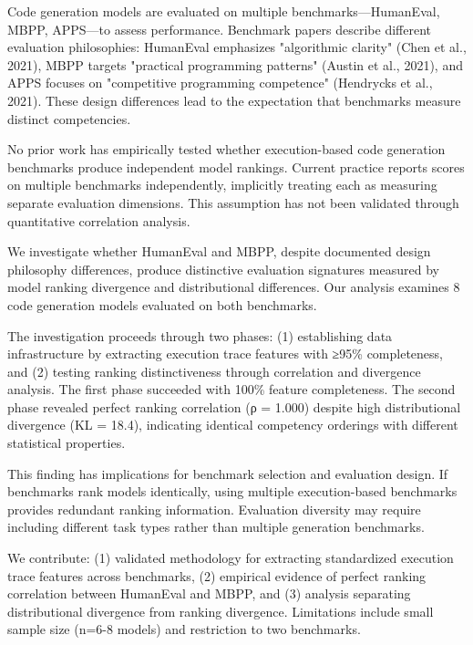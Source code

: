 
Code generation models are evaluated on multiple benchmarks—HumanEval, MBPP, APPS—to assess performance. Benchmark papers describe different evaluation philosophies: HumanEval emphasizes "algorithmic clarity" (Chen et al., 2021), MBPP targets "practical programming patterns" (Austin et al., 2021), and APPS focuses on "competitive programming competence" (Hendrycks et al., 2021). These design differences lead to the expectation that benchmarks measure distinct competencies.

No prior work has empirically tested whether execution-based code generation benchmarks produce independent model rankings. Current practice reports scores on multiple benchmarks independently, implicitly treating each as measuring separate evaluation dimensions. This assumption has not been validated through quantitative correlation analysis.

We investigate whether HumanEval and MBPP, despite documented design philosophy differences, produce distinctive evaluation signatures measured by model ranking divergence and distributional differences. Our analysis examines 8 code generation models evaluated on both benchmarks.

The investigation proceeds through two phases: (1) establishing data infrastructure by extracting execution trace features with ≥95\% completeness, and (2) testing ranking distinctiveness through correlation and divergence analysis. The first phase succeeded with 100\% feature completeness. The second phase revealed perfect ranking correlation (ρ = 1.000) despite high distributional divergence (KL = 18.4), indicating identical competency orderings with different statistical properties.

This finding has implications for benchmark selection and evaluation design. If benchmarks rank models identically, using multiple execution-based benchmarks provides redundant ranking information. Evaluation diversity may require including different task types rather than multiple generation benchmarks.

We contribute: (1) validated methodology for extracting standardized execution trace features across benchmarks, (2) empirical evidence of perfect ranking correlation between HumanEval and MBPP, and (3) analysis separating distributional divergence from ranking divergence. Limitations include small sample size (n=6-8 models) and restriction to two benchmarks.
